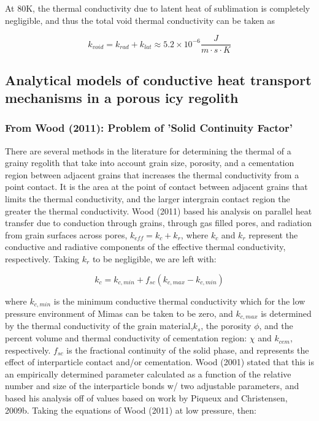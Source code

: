 \documentclass[11pt]{article} %
\begin{document}
	At 80K, the thermal conductivity due to latent heat of sublimation is completely negligible, and thus the total void thermal conductivity can be taken as 
	
	\begin{equation}
	k_{void} = k_{rad} + k_{lat} \approx 5.2\times10^{-6} \frac{J}{m \cdot s \cdot K}
	\end{equation}

\subsection{Analytical models of conductive heat transport mechanisms in a porous icy regolith}

\subsubsection{From Wood (2011): Problem of 'Solid Continuity Factor'}
	There are several methods in the literature for determining the thermal of a grainy regolith that take into account grain size, porosity, and a cementation region between adjacent grains that increases the thermal conductivity from a point contact. It is the area at the point of contact between adjacent grains that limits the thermal conductivity, and the larger intergrain contact region the greater the thermal conductivity. Wood (2011) based his analysis on parallel heat transfer due to conduction through grains, through gas filled pores, and radiation from grain surfaces across pores, $k_{eff} = k_{c} + k_{r}$, where $k_{c}$ and $k_{r}$ represent the conductive and radiative components of the effective thermal conductivity, respectively. Taking $k_{r}$ to be negligible, we are left with:
	
	\begin{equation}
	k_{c} = k_{c,min} +f_{sc}(k_{c,max}-k_{c,min})
	\end{equation}
	
	where $k_{c,min}$ is the minimum conductive thermal conductivity which for the low pressure environment of Mimas can be taken to be zero, and $k_{c,max}$ is determined by the thermal conductivity of the grain material,$ k_{s}$, the porosity $\phi$, and the percent volume and thermal conductivity of cementation region: $\chi$ and $k_{cem}$, respectively. $f_{sc}$ is the fractional continuity of the solid phase, and represents the effect of interparticle contact and/or cementation. Wood (2001) stated that this is an empirically determined parameter calculated as a function of the relative number and size of the interparticle bonds w/ two adjustable parameters, and based his analysis off of values based on work by Piqueux and Christensen, 2009b. Taking the equations of Wood (2011) at low pressure, then:
	
\end{document}

